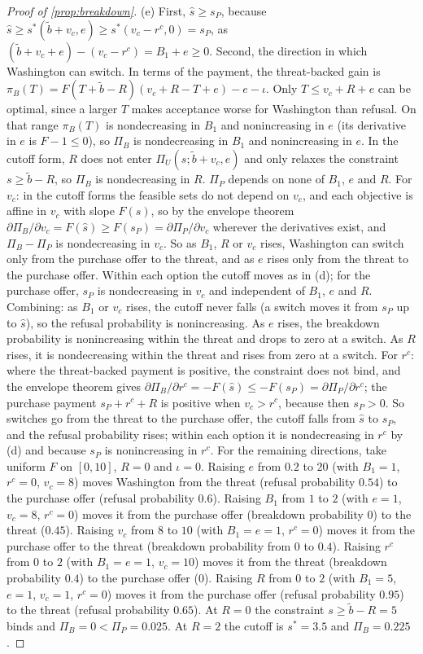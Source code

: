 \begin{proof}[Proof of \cref{prop:breakdown}]
(e) First, $\hat s\ge s_P$, because $\hat s\ge s^*(\tilde b+v_c,e)\ge s^*(v_c-r^c,0)=s_P$, as $(\tilde b+v_c+e)-(v_c-r^c)=B_1+e\ge 0$. Second, the direction in which Washington can switch. In terms of the payment, the threat-backed gain is $\pi_B(T)=F(T+\tilde b-R)(v_c+R-T+e)-e-\iota$. Only $T\le v_c+R+e$ can be optimal, since a larger $T$ makes acceptance worse for Washington than refusal. On that range $\pi_B(T)$ is nondecreasing in $B_1$ and nonincreasing in $e$ (its derivative in $e$ is $F-1\le 0$), so $\Pi_B$ is nondecreasing in $B_1$ and nonincreasing in $e$. In the cutoff form, $R$ does not enter $\Pi_U(s;\tilde b+v_c,e)$ and only relaxes the constraint $s\ge\tilde b-R$, so $\Pi_B$ is nondecreasing in $R$. $\Pi_P$ depends on none of $B_1$, $e$ and $R$. For $v_c$: in the cutoff forms the feasible sets do not depend on $v_c$, and each objective is affine in $v_c$ with slope $F(s)$, so by the envelope theorem $\partial\Pi_B/\partial v_c=F(\hat s)\ge F(s_P)=\partial\Pi_P/\partial v_c$ wherever the derivatives exist, and $\Pi_B-\Pi_P$ is nondecreasing in $v_c$. So as $B_1$, $R$ or $v_c$ rises, Washington can switch only from the purchase offer to the threat, and as $e$ rises only from the threat to the purchase offer. Within each option the cutoff moves as in (d); for the purchase offer, $s_P$ is nondecreasing in $v_c$ and independent of $B_1$, $e$ and $R$.
Combining: as $B_1$ or $v_c$ rises, the cutoff never falls (a switch moves it from $s_P$ up to $\hat s$), so the refusal probability is nonincreasing. As $e$ rises, the breakdown probability is nonincreasing within the threat and drops to zero at a switch. As $R$ rises, it is nondecreasing within the threat and rises from zero at a switch. For $r^c$: where the threat-backed payment is positive, the constraint does not bind, and the envelope theorem gives $\partial\Pi_B/\partial r^c=-F(\hat s)\le-F(s_P)=\partial\Pi_P/\partial r^c$; the purchase payment $s_P+r^c+R$ is positive when $v_c>r^c$, because then $s_P>0$. So switches go from the threat to the purchase offer, the cutoff falls from $\hat s$ to $s_P$, and the refusal probability rises; within each option it is nondecreasing in $r^c$ by (d) and because $s_P$ is nonincreasing in $r^c$.
For the remaining directions, take uniform $F$ on $[0,10]$, $R=0$ and $\iota=0$. Raising $e$ from $0.2$ to $20$ (with $B_1=1$, $r^c=0$, $v_c=8$) moves Washington from the threat (refusal probability $0.54$) to the purchase offer (refusal probability $0.6$). Raising $B_1$ from $1$ to $2$ (with $e=1$, $v_c=8$, $r^c=0$) moves it from the purchase offer (breakdown probability $0$) to the threat ($0.45$). Raising $v_c$ from $8$ to $10$ (with $B_1=e=1$, $r^c=0$) moves it from the purchase offer to the threat (breakdown probability from $0$ to $0.4$). Raising $r^c$ from $0$ to $2$ (with $B_1=e=1$, $v_c=10$) moves it from the threat (breakdown probability $0.4$) to the purchase offer ($0$). Raising $R$ from $0$ to $2$ (with $B_1=5$, $e=1$, $v_c=1$, $r^c=0$) moves it from the purchase offer (refusal probability $0.95$) to the threat (refusal probability $0.65$). At $R=0$ the constraint $s\ge\tilde b-R=5$ binds and $\Pi_B=0<\Pi_P=0.025$. At $R=2$ the cutoff is $s^*=3.5$ and $\Pi_B=0.225$.
\end{proof}

